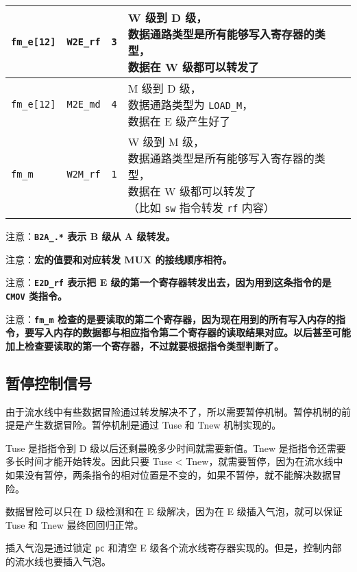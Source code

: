 \documentclass[12pt,AutoFakeBold,AutoFakeSlant]{article}
\begin{document}
\begin{longtable}[]{@{}|l|l|l|l|@{}}
\texttt{fm\_e{[}12{]}} & \texttt{W2E\_rf} & \texttt{3} & \makecell{W 级到 D 级，\\数据通路类型是所有能够写入寄存器的类型，\\数据在 W 级都可以转发了}\tabularnewline\hline
\texttt{fm\_e{[}12{]}} & \texttt{M2E\_md} & \texttt{4} & \makecell{M 级到 D 级，\\数据通路类型为 \texttt{LOAD\_M}，\\数据在 E 级产生好了}\tabularnewline\hline
\texttt{fm\_m} & \texttt{W2M\_rf} & \texttt{1} & \makecell{W 级到 M 级，\\数据通路类型是所有能够写入寄存器的类型，\\数据在 W 级都可以转发了\\（比如 \texttt{sw} 指令转发 \texttt{rf} 内容）}\tabularnewline\hline

\end{longtable}

注意：\textbf{\texttt{B2A\_.*} 表示 B 级从 A 级转发。}

注意：\textbf{宏的值要和对应转发 MUX 的接线顺序相符。}

注意：\textbf{\texttt{E2D\_rf} 表示把 E 级的第一个寄存器转发出去，因为用到这条指令的是 \texttt{CMOV} 类指令。}

注意：\textbf{\texttt{fm\_m}
检查的是要读取的第二个寄存器，因为现在用到的所有写入内存的指令，要写入内存的数据都与相应指令第二个寄存器的读取结果对应。以后甚至可能加上检查要读取的第一个寄存器，不过就要根据指令类型判断了。}

\hypertarget{ux6682ux505cux63a7ux5236ux4fe1ux53f7}{%
\subsection{暂停控制信号}\label{ux6682ux505cux63a7ux5236ux4fe1ux53f7}}

由于流水线中有些数据冒险通过转发解决不了，所以需要暂停机制。暂停机制的前提是产生数据冒险。暂停机制是通过
Tuse 和 Tnew 机制实现的。

Tuse 是指指令到 D 级以后还剩最晚多少时间就需要新值。Tnew
是指指令还需要多长时间才能开始转发。因此只要 Tuse \textless{}
Tnew，就需要暂停，因为在流水线中如果没有暂停，两条指令的相对位置是不变的，如果不暂停，就不能解决数据冒险。

数据冒险可以只在 D 级检测和在 E 级解决，因为在 E 级插入气泡，就可以保证
Tuse 和 Tnew 最终回回归正常。

插入气泡是通过锁定 \texttt{pc} 和清空 E
级各个流水线寄存器实现的。但是，控制内部的流水线也要插入气泡。
\end{document}
